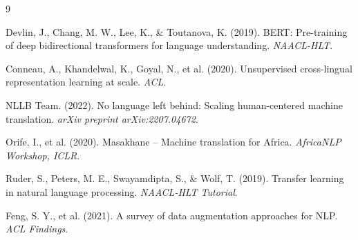 \documentclass[10pt,twocolumn]{article}
\begin{document}
\begin{thebibliography}{9}

Devlin, J., Chang, M. W., Lee, K., \& Toutanova, K. (2019).
BERT: Pre-training of deep bidirectional transformers for language understanding.
\textit{NAACL-HLT}.

Conneau, A., Khandelwal, K., Goyal, N., et al. (2020).
Unsupervised cross-lingual representation learning at scale.
\textit{ACL}.

NLLB Team. (2022).
No language left behind: Scaling human-centered machine translation.
\textit{arXiv preprint arXiv:2207.04672}.

Orife, I., et al. (2020).
Masakhane -- Machine translation for Africa.
\textit{AfricaNLP Workshop, ICLR}.

Ruder, S., Peters, M. E., Swayamdipta, S., \& Wolf, T. (2019).
Transfer learning in natural language processing.
\textit{NAACL-HLT Tutorial}.

Feng, S. Y., et al. (2021).
A survey of data augmentation approaches for NLP.
\textit{ACL Findings}.

\end{thebibliography}
\end{document}
